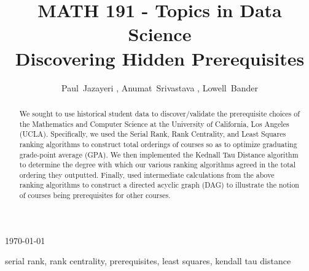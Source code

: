 \documentclass[10pt]{siamltex}
\begin{document}
\begin{pagewiselinenumbers}
\title{MATH 191 - Topics in Data Science\\ Discovering Hidden Prerequisites}
\author{Paul~Jazayeri \footnotemark[1], Anumat~Srivastava \footnotemark[2], Lowell~Bander \footnotemark[3]  }
\maketitle

\begin{center}
\today
\end{center}

\vspace{5mm}

\begin{abstract}
We sought to use historical student data to discover/validate the prerequisite choices of the Mathematics and Computer Science at the University of California, Los Angeles (UCLA). Specifically, we used the Serial Rank, Rank Centrality, and Least Squares ranking algorithms to construct total orderings of courses so as to optimize graduating grade-point average (GPA). We then implemented the Kednall Tau Distance algorithm to determine the degree with which our various ranking algorithms agreed in the total ordering they outputted. Finally, used intermediate calculations from the above ranking algorithms to construct a directed acyclic graph (DAG) to illustrate the notion of courses being prerequisites for other courses.
\end{abstract}

\begin{keywords} %
serial rank, rank centrality, prerequisites, least squares, kendall tau distance
\end{keywords}


\end{pagewiselinenumbers}
\end{document}
